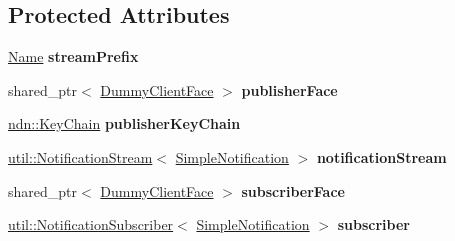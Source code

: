 \subsection*{Protected Attributes}
\begin{DoxyCompactItemize}
\item 
\hyperlink{classndn_1_1Name}{Name} {\bfseries stream\+Prefix}\hypertarget{classndn_1_1util_1_1tests_1_1EndToEndFixture_a6467695f2c33c47924a3d10aa69258c0}{}\label{classndn_1_1util_1_1tests_1_1EndToEndFixture_a6467695f2c33c47924a3d10aa69258c0}

\item 
shared\+\_\+ptr$<$ \hyperlink{classndn_1_1util_1_1DummyClientFace}{Dummy\+Client\+Face} $>$ {\bfseries publisher\+Face}\hypertarget{classndn_1_1util_1_1tests_1_1EndToEndFixture_ae6091d617a2e9d995baf7e96eb48853d}{}\label{classndn_1_1util_1_1tests_1_1EndToEndFixture_ae6091d617a2e9d995baf7e96eb48853d}

\item 
\hyperlink{classndn_1_1security_1_1KeyChain}{ndn\+::\+Key\+Chain} {\bfseries publisher\+Key\+Chain}\hypertarget{classndn_1_1util_1_1tests_1_1EndToEndFixture_ad4ec647b45eee50e13d9e1576a8a03a0}{}\label{classndn_1_1util_1_1tests_1_1EndToEndFixture_ad4ec647b45eee50e13d9e1576a8a03a0}

\item 
\hyperlink{classndn_1_1util_1_1NotificationStream}{util\+::\+Notification\+Stream}$<$ \hyperlink{classndn_1_1util_1_1tests_1_1SimpleNotification}{Simple\+Notification} $>$ {\bfseries notification\+Stream}\hypertarget{classndn_1_1util_1_1tests_1_1EndToEndFixture_a06747b661a8f63b8a5e788e24b2b2f5e}{}\label{classndn_1_1util_1_1tests_1_1EndToEndFixture_a06747b661a8f63b8a5e788e24b2b2f5e}

\item 
shared\+\_\+ptr$<$ \hyperlink{classndn_1_1util_1_1DummyClientFace}{Dummy\+Client\+Face} $>$ {\bfseries subscriber\+Face}\hypertarget{classndn_1_1util_1_1tests_1_1EndToEndFixture_a21ced3df1d2463fd3a996c2112c86813}{}\label{classndn_1_1util_1_1tests_1_1EndToEndFixture_a21ced3df1d2463fd3a996c2112c86813}

\item 
\hyperlink{classndn_1_1util_1_1NotificationSubscriber}{util\+::\+Notification\+Subscriber}$<$ \hyperlink{classndn_1_1util_1_1tests_1_1SimpleNotification}{Simple\+Notification} $>$ {\bfseries subscriber}\hypertarget{classndn_1_1util_1_1tests_1_1EndToEndFixture_ab0c7bbd791e9b2b3632ff9d7cf42da97}{}\label{classndn_1_1util_1_1tests_1_1EndToEndFixture_ab0c7bbd791e9b2b3632ff9d7cf42da97}


\end{DoxyCompactItemize}
